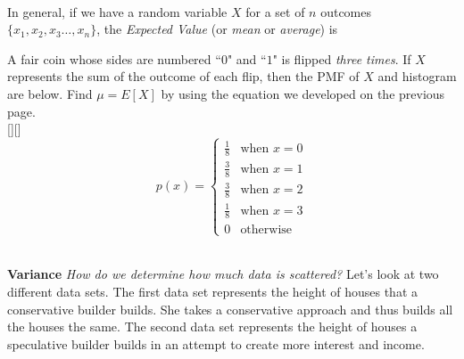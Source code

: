 \documentclass[10pt]{article}
\begin{document}
 \\
 In general, if we have a random variable $X$ for a set of $n$ outcomes $\{x_1,x_2,x_3\dots,x_n\}$, the {\em  Expected Value}   (or {\em mean} or {\em average}) is 


\newpage

\exercise{} A fair coin whose sides are numbered ``$0$" and ``$1$" is flipped {\it three times}. If $X$ represents the sum of the outcome of each flip, then the PMF of $X$ and histogram are below.  Find $\mu=E[X]$ by using the equation we developed on the previous page.\\
[][]{
\[ p(x)=\begin{cases}
\frac18 & \text{when }x=0\\
\frac38 & \text{when }x=1\\
\frac38 & \text{when }x=2\\
\frac18 & \text{when }x=3\\
0 & \text{otherwise}
\end{cases}\]
}{
}{
%
}
~\\
{\bf Variance} {\em How do we determine how much data is scattered?} Let's look at two different data sets. The first data set represents the height of houses that a conservative builder builds. She takes a conservative approach and thus builds all the houses the same.  The second data set represents the height of houses  a speculative builder builds in an attempt to create more interest and income.   
\end{document}
